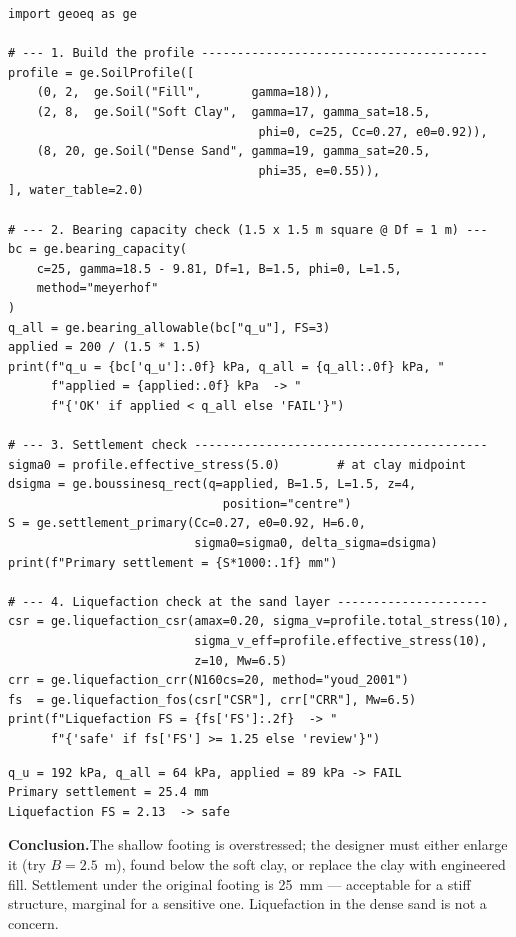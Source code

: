 \documentclass[11pt,a4paper,openany]{book}
\begin{document}
\begin{lstlisting}
import geoeq as ge

# --- 1. Build the profile ----------------------------------------
profile = ge.SoilProfile([
    (0, 2,  ge.Soil("Fill",       gamma=18)),
    (2, 8,  ge.Soil("Soft Clay",  gamma=17, gamma_sat=18.5,
                                   phi=0, c=25, Cc=0.27, e0=0.92)),
    (8, 20, ge.Soil("Dense Sand", gamma=19, gamma_sat=20.5,
                                   phi=35, e=0.55)),
], water_table=2.0)

# --- 2. Bearing capacity check (1.5 x 1.5 m square @ Df = 1 m) ---
bc = ge.bearing_capacity(
    c=25, gamma=18.5 - 9.81, Df=1, B=1.5, phi=0, L=1.5,
    method="meyerhof"
)
q_all = ge.bearing_allowable(bc["q_u"], FS=3)
applied = 200 / (1.5 * 1.5)
print(f"q_u = {bc['q_u']:.0f} kPa, q_all = {q_all:.0f} kPa, "
      f"applied = {applied:.0f} kPa  -> "
      f"{'OK' if applied < q_all else 'FAIL'}")

# --- 3. Settlement check -----------------------------------------
sigma0 = profile.effective_stress(5.0)        # at clay midpoint
dsigma = ge.boussinesq_rect(q=applied, B=1.5, L=1.5, z=4,
                              position="centre")
S = ge.settlement_primary(Cc=0.27, e0=0.92, H=6.0,
                          sigma0=sigma0, delta_sigma=dsigma)
print(f"Primary settlement = {S*1000:.1f} mm")

# --- 4. Liquefaction check at the sand layer ---------------------
csr = ge.liquefaction_csr(amax=0.20, sigma_v=profile.total_stress(10),
                          sigma_v_eff=profile.effective_stress(10),
                          z=10, Mw=6.5)
crr = ge.liquefaction_crr(N160cs=20, method="youd_2001")
fs  = ge.liquefaction_fos(csr["CSR"], crr["CRR"], Mw=6.5)
print(f"Liquefaction FS = {fs['FS']:.2f}  -> "
      f"{'safe' if fs['FS'] >= 1.25 else 'review'}")
\end{lstlisting}
\begin{lstlisting}[style=output]
q_u = 192 kPa, q_all = 64 kPa, applied = 89 kPa -> FAIL
Primary settlement = 25.4 mm
Liquefaction FS = 2.13  -> safe
\end{lstlisting}

\textbf{Conclusion.}\quad The shallow footing is overstressed; the
designer must either enlarge it (try $B = 2.5$~m), found below the
soft clay, or replace the clay with engineered fill. Settlement
under the original footing is 25~mm --- acceptable for a stiff
structure, marginal for a sensitive one. Liquefaction in the
dense sand is not a concern.
\end{document}
